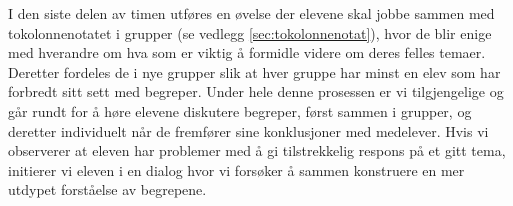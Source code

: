 \documentclass[main.tex]{subfiles}
\begin{document}
\newline
\newline
I den siste delen av timen utføres en øvelse der elevene skal jobbe sammen med tokolonnenotatet i 
grupper (se vedlegg \ref{sec:tokolonnenotat}), hvor de blir enige med hverandre om hva som er viktig 
å formidle videre om deres felles temaer. Deretter fordeles de i nye grupper slik at hver gruppe har 
minst en elev som har forbredt sitt sett med begreper. Under hele denne prosessen er vi 
tilgjengelige og går rundt for å høre elevene diskutere begreper, først sammen i grupper, og 
deretter individuelt når de fremfører sine konklusjoner med medelever. Hvis vi observerer at eleven 
har problemer med å gi tilstrekkelig respons på et gitt tema, initierer vi eleven i en dialog hvor 
vi forsøker å sammen konstruere en mer utdypet forståelse av begrepene. 


\end{document}

